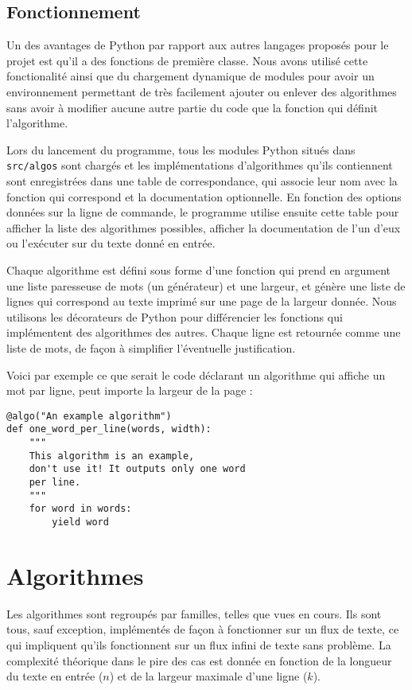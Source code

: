 \documentclass{article}
\begin{document}
\section{Fonctionnement}

Un des avantages de Python par rapport aux autres langages proposés pour le
projet est qu'il a des fonctions de première classe. Nous avons utilisé cette
fonctionalité ainsi que du chargement dynamique de modules pour avoir un
environnement permettant de très facilement ajouter ou enlever des algorithmes
sans avoir à modifier aucune autre partie du code que la fonction qui définit
l'algorithme.

Lors du lancement du programme, tous les modules Python situés dans
\verb|src/algos| sont chargés et les implémentations d'algorithmes qu'ils
contiennent sont enregistrées dans une table de correspondance, qui associe leur
nom avec la fonction qui correspond et la documentation optionnelle. En fonction
des options données sur la ligne de commande, le programme utilise ensuite cette
table pour afficher la liste des algorithmes possibles, afficher la
documentation de l'un d'eux ou l'exécuter sur du texte donné en entrée.

Chaque algorithme est défini sous forme d'une fonction qui prend en argument une
liste paresseuse de mots (un générateur) et une largeur, et génère une liste
de lignes qui correspond au texte imprimé sur une page de la largeur donnée.
Nous utilisons les décorateurs de Python pour différencier les fonctions qui
implémentent des algorithmes des autres. Chaque ligne est retournée comme une
liste de mots, de façon à simplifier l'éventuelle justification.

Voici par exemple ce que serait le code déclarant un algorithme qui affiche un
mot par ligne, peut importe la largeur de la page :

\begin{verbatim}
@algo("An example algorithm")
def one_word_per_line(words, width):
    """
    This algorithm is an example,
    don't use it! It outputs only one word
    per line.
    """
    for word in words:
        yield word
\end{verbatim}

\chapter{Algorithmes}

Les algorithmes sont regroupés par familles, telles que vues en cours. Ils sont
tous, sauf exception, implémentés de façon à fonctionner sur un flux de texte,
ce qui impliquent qu'ils fonctionnent sur un flux infini de texte sans problème.
La complexité théorique dans le pire des cas est donnée en fonction de la
longueur du texte en entrée ($n$) et de la largeur maximale d'une ligne ($k$).
\end{document}
